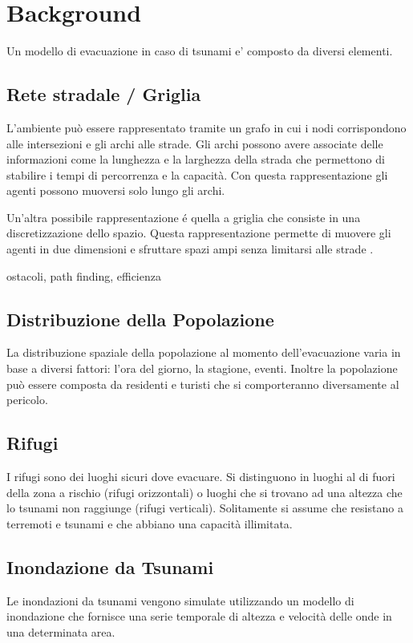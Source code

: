 \section{Background}
Un modello di evacuazione in caso di tsunami e' composto da diversi elementi.

\subsection{Rete stradale / Griglia}
L'ambiente può essere rappresentato tramite un grafo in cui i nodi corrispondono alle intersezioni e
gli archi alle strade.
Gli archi possono avere associate delle informazioni come la lunghezza e la larghezza della strada che
permettono di stabilire i tempi di percorrenza e la capacità.
Con questa rappresentazione gli agenti possono muoversi solo lungo gli archi.

Un'altra possibile rappresentazione é quella a griglia che consiste in una discretizzazione
dello spazio. Questa rappresentazione permette di muovere gli agenti in due dimensioni e sfruttare
spazi ampi senza limitarsi alle strade \parencite{makinoshima2018enhancing}.

ostacoli, path finding, efficienza


\subsection{Distribuzione della Popolazione}
La distribuzione spaziale della popolazione al momento dell'evacuazione varia in base a diversi fattori:
l'ora del giorno, la stagione, eventi. Inoltre la popolazione può essere composta da residenti e
turisti che si comporteranno diversamente al pericolo.

\subsection{Rifugi}
I rifugi sono dei luoghi sicuri dove evacuare.
Si distinguono in luoghi al di fuori della zona a rischio (rifugi orizzontali) o
luoghi che si trovano ad una altezza che lo tsunami non raggiunge (rifugi verticali).
%
Solitamente si assume che resistano a terremoti e tsunami e
che abbiano una capacità illimitata.

\subsection{Inondazione da Tsunami}
Le inondazioni da tsunami vengono simulate utilizzando un modello di inondazione
che fornisce una serie temporale di altezza e velocità delle onde in una determinata area.

